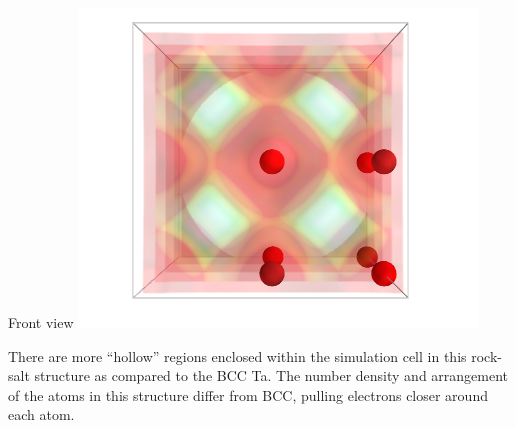 \documentclass[11pt]{article}
\begin{document}
\begin{itemize}
Front view
\includegraphics[width=.9\linewidth]{./images/TaC_front.png}

There are more ``hollow'' regions enclosed within the simulation cell in this rock-salt structure  as compared to the BCC Ta.  The number density and arrangement of the atoms in this structure differ from BCC, pulling electrons closer around each atom.
\end{itemize} %
\end{document}
